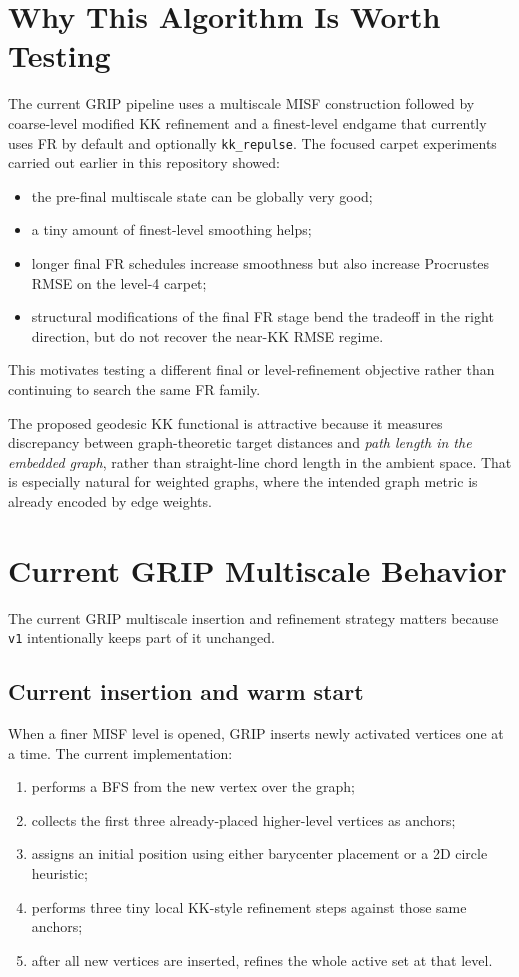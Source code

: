 \documentclass[11pt]{article}
\newcommand{\code}[1]{\begingroup\urlstyle{tt}\nolinkurl{#1}\endgroup}
\begin{document}
\section{Why This Algorithm Is Worth Testing}

The current GRIP pipeline uses a multiscale MISF construction followed by
coarse-level modified KK refinement and a finest-level endgame that currently
uses FR by default and optionally \code{kk\_repulse}. The focused carpet
experiments carried out earlier in this repository showed:
\begin{itemize}[leftmargin=1.4em]
  \item the pre-final multiscale state can be globally very good;
  \item a tiny amount of finest-level smoothing helps;
  \item longer final FR schedules increase smoothness but also increase
    Procrustes RMSE on the level-4 carpet;
  \item structural modifications of the final FR stage bend the tradeoff in the
    right direction, but do not recover the near-KK RMSE regime.
\end{itemize}

This motivates testing a different final or level-refinement objective rather
than continuing to search the same FR family.

The proposed geodesic KK functional is attractive because it measures
discrepancy between graph-theoretic target distances and \emph{path length in
the embedded graph}, rather than straight-line chord length in the ambient
space. That is especially natural for weighted graphs, where the intended graph
metric is already encoded by edge weights.

\section{Current GRIP Multiscale Behavior}

The current GRIP multiscale insertion and refinement strategy matters because
\code{v1} intentionally keeps part of it unchanged.

\subsection{Current insertion and warm start}

When a finer MISF level is opened, GRIP inserts newly activated vertices one at
a time. The current implementation:
\begin{enumerate}[leftmargin=1.8em]
  \item performs a BFS from the new vertex over the graph;
  \item collects the first three already-placed higher-level vertices as
    anchors;
  \item assigns an initial position using either barycenter placement or a
    2D circle heuristic;
  \item performs three tiny local KK-style refinement steps against those same
    anchors;
  \item after all new vertices are inserted, refines the whole active set at
    that level.
\end{enumerate}
\end{document}
